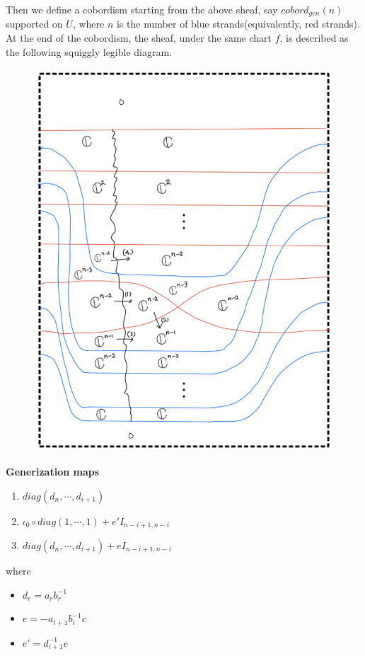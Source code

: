 Then we define a cobordism starting from the above sheaf, say $cobord_{gen}(n)$ supported on $U$, where $n$ is the number of blue strands(equivalently, red strands). At the end of the cobordism, the sheaf, under the same chart $f$, is described as the following squiggly legible diagram. 
\begin{figure}[H]
    \centering
    \includegraphics[scale = 0.95]{diagrams/cobord_gen/15.png}
    \caption{}
    \label{fig:your-label}
\end{figure}
\pagebreak
\textbf{Generization maps}
\begin{enumerate}[label = (\arabic*)]
\item $diag(d_n,\cdots,d_{i+1})$

\item $\iota_0 \circ diag(1,\cdots,1) + e' I_{n-i+1,n-i}$

\item $diag(d_n,\cdots,d_{i+1}) + e I_{n-i+1,n-i}$
\end{enumerate}
where
\begin{itemize}
\item $d_r = a_r b_r^{-1}$
\item $e = -a_{i+1}b_i^{-1}c$
\item $e' = d_{i+1}^{-1}e$
\end{itemize}

